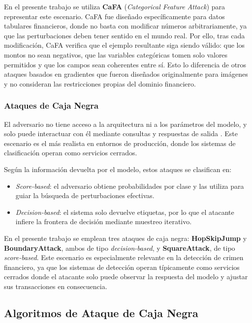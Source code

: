 En el presente trabajo se utiliza \textbf{CaFA} (\textit{Categorical Feature Attack}) \cite{cartella2021adversarial} para representar este escenario. CaFA fue diseñado específicamente para datos tabulares financieros, donde no basta con modificar números arbitrariamente, ya que las perturbaciones deben tener sentido en el mundo real. Por ello, tras cada modificación, CaFA verifica que el ejemplo resultante siga siendo válido: que los montos no sean negativos, que las variables categóricas tomen solo valores permitidos y que los campos sean coherentes entre sí. Esto lo diferencia de otros ataques basados en gradientes que fueron diseñados originalmente para imágenes y no consideran las restricciones propias del dominio financiero.

\subsubsection{Ataques de Caja Negra}

El adversario no tiene acceso a la arquitectura ni a los parámetros del modelo, y solo puede interactuar con él mediante consultas y respuestas de salida \cite{shokri2017membership}. Este escenario es el más realista en entornos de producción, donde los sistemas de clasificación operan como servicios cerrados.

Según la información devuelta por el modelo, estos ataques se clasifican en:
\begin{itemize}
    \item \textit{Score-based}: el adversario obtiene probabilidades por clase y las utiliza para guiar la búsqueda de perturbaciones efectivas.
    \item \textit{Decision-based}: el sistema solo devuelve etiquetas, por lo que el atacante infiere la frontera de decisión mediante muestreo iterativo.
\end{itemize}

En el presente trabajo se emplean tres ataques de caja negra: \textbf{HopSkipJump} y \textbf{BoundaryAttack}, ambos de tipo \textit{decision-based}, y \textbf{SquareAttack}, de tipo \textit{score-based}. Este escenario es especialmente relevante en la detección de crimen financiero, ya que los sistemas de detección operan típicamente como servicios cerrados donde el atacante solo puede observar la respuesta del modelo y ajustar sus transacciones en consecuencia.


\subsection{Algoritmos de Ataque de Caja Negra}

